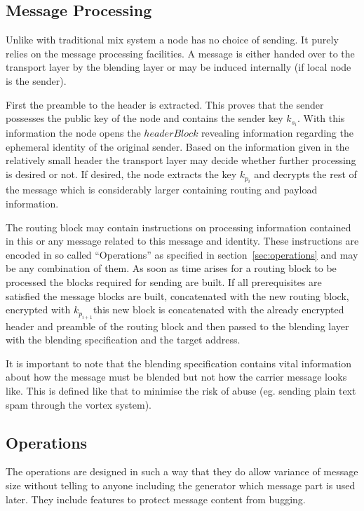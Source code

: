 \documentclass[9pt,journal,compsoc]{IEEEtran}
\begin{document}
\subsection{Message Processing\label{sec:processing}}
Unlike with traditional mix system a node has no choice of sending. It purely relies on the message processing facilities. A message is either handed over to the transport layer by the blending layer or may be induced internally (if local node is the sender). 

First the preamble to the header is extracted. This proves that the sender possesses the public key of the node and contains the sender key $k_{s_i}$. With this information the node opens the $headerBlock$ revealing information regarding the ephemeral identity of the original sender. Based on the information given in the relatively small header the transport layer may decide whether further processing is desired or not. If desired, the node extracts the key $k_{p_i}$ and decrypts the rest of the message which is considerably larger containing routing and payload information.

The routing block may contain instructions on processing information contained in this or any message related to this message and identity. These instructions are encoded in so called ``Operations'' as specified in section~\ref{sec:operations} and may be any combination of them. As soon as time arises for a routing block to be processed the blocks required for sending are built. If all prerequisites are satisfied the message blocks are built, concatenated with the new routing block, encrypted with $k_{p_{i+1}}$this new block is concatenated with the already encrypted header and preamble of the routing block and then passed to the blending layer with the blending specification and the target address.

It is important to note that the blending specification contains vital information about how the message must be blended but not how the carrier message looks like. This is defined like that to minimise the risk of abuse (eg. sending plain text spam through the vortex system).

\subsection{Operations\label{sec:operations}}
The operations are designed in such a way that they do allow  variance of message size without telling to anyone including the generator which message part is used later. They include features to protect message content from bugging.
\end{document}

